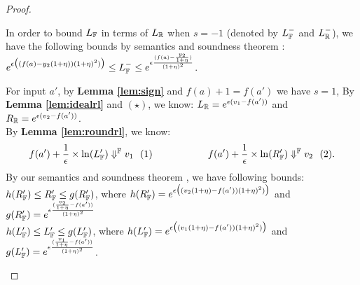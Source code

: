 \documentclass[a4paper,11pt]{article}
\begin{document}
\begin{proof}
\begin{itemize}
\begin{itemize}
	In order to bound $L_{\mathbb{F}}$ in terms of $L_{\mathbb{R}}$ when $s = -1$ (denoted by $L_{\mathbb{F}}^-$ and $L_{\mathbb{R}}^-$), we have the following bounds by semantics and soundness theorem :		%
		$e^{\epsilon 
				\big( (f(a) - y_2(1 + \eta)) (1 + \eta)^2) \big)}
        \leq
        L_{\mathbb{F}}^- \leq
        e^{\epsilon 
				\frac{(f(a) - \frac{y_2}{1 + \eta})}{(1 + \eta)^2}}$.
	\end{itemize}
		For input $a'$, by \textbf{Lemma \ref{lem:sign}} and $f(a) + 1 = f(a')$ we have $s = 1$, 
		By \textbf{Lemma \ref{lem:idealrl}} and $(\star) $, we know: $L_{\mathbb{R}} = e^{\epsilon(v_1 - f(a'))}$ and 
		$R_{\mathbb{R}} = e^{\epsilon(v_2 - f(a'))}$.
		\\
		By \textbf{Lemma \ref{lem:roundrl}}, we know:
		$$f(a') + \frac{1}{\epsilon} \times \ln(L_{\mathbb{F}}') \Downarrow^{\mathbb{F}} v_1 ~~ (1)
		~~~~~~~~~~~~~~~~~
		f(a') + \frac{1}{\epsilon} \times \ln(R_{\mathbb{F}}') \Downarrow^{\mathbb{F}} v_2 ~~ (2).$$
		By our semantics and soundness theorem , we have following bounds:
		\\
		$h(R_{\mathbb{F}}') \leq R_{\mathbb{F}}' \leq g(R_{\mathbb{F}}')$,
		where 
		$h(R_{\mathbb{F}}') = e^{\epsilon 
		\big( (v_2(1 + \eta) - f(a')) (1 + \eta)^2) \big)}$ 
		and
		$g(R_{\mathbb{F}}') = e^{\epsilon \frac{(\frac{v_2}{1 + \eta} - f(a'))}
		{(1 + \eta)^2}}$
		\\
		$h(L_{\mathbb{F}}') \leq L_{\mathbb{F}}' \leq g(L_{\mathbb{F}}')$, 
		where 
		$h(L_{\mathbb{F}}') = e^{\epsilon 
		\big( (v_1(1 + \eta) - f(a')) (1 + \eta)^2) \big)}$ 
		and
		$g(L_{\mathbb{F}}') = e^{\epsilon \frac{(\frac{v_1}{1 + \eta} - f(a'))}
		{(1 + \eta)^2}}$.



\end{itemize}
\end{proof}
\end{document}
